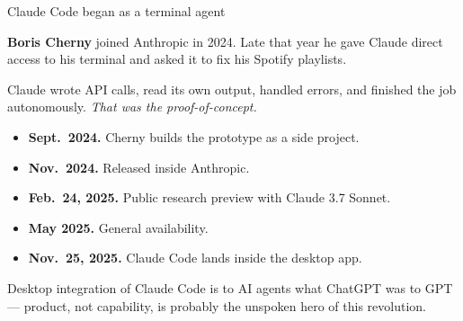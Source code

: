 \documentclass[aspectratio=169,11pt]{beamer}
\begin{document}
\begin{frame}{Claude Code began as a terminal agent}

\textbf{Boris Cherny} joined Anthropic in 2024. Late that year he gave Claude direct access to his terminal and asked it to fix his Spotify playlists.

\vspace{0.3cm}

Claude wrote API calls, read its own output, handled errors, and finished the job autonomously. \textit{That was the proof-of-concept.}

\vspace{0.35cm}

\begin{itemize}\setlength\itemsep{0.15em}
    \item \textbf{Sept.\ 2024.} Cherny builds the prototype as a side project.
    \item \textbf{Nov.\ 2024.} Released inside Anthropic.
    \item \textbf{Feb.\ 24, 2025.} Public research preview with Claude 3.7 Sonnet.
    \item \textbf{May 2025.} General availability.
    \item \textbf{Nov.\ 25, 2025.} Claude Code lands inside the desktop app.
\end{itemize}

\vspace{0.25cm}

\alert{Desktop integration of Claude Code is to AI agents what ChatGPT was to GPT --- product, not capability, is probably the unspoken hero of this revolution.}
\end{frame}
\end{document}

